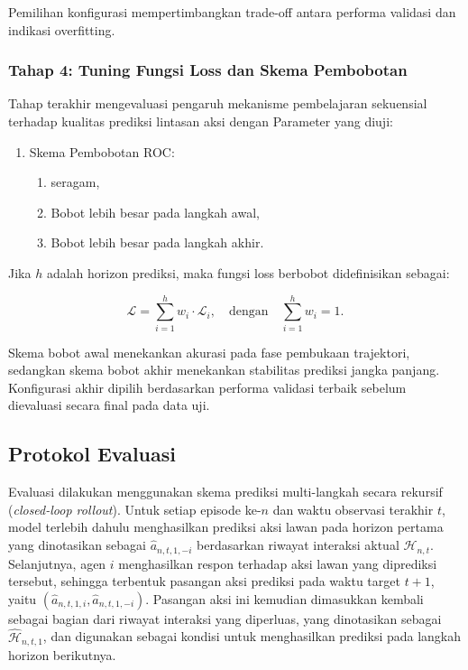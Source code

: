 \noindent
Pemilihan konfigurasi mempertimbangkan trade-off antara performa validasi dan indikasi overfitting.

\subsubsection{Tahap 4: Tuning Fungsi Loss dan Skema Pembobotan}

Tahap terakhir mengevaluasi pengaruh mekanisme pembelajaran sekuensial terhadap kualitas prediksi lintasan aksi dengan Parameter yang diuji:

\begin{enumerate}
    \item Skema Pembobotan ROC:
    \begin{enumerate}
        \item seragam,
        \item Bobot lebih besar pada langkah awal,
        \item Bobot lebih besar pada langkah akhir.
    \end{enumerate}
\end{enumerate}

\noindent
Jika $h$ adalah horizon prediksi, maka fungsi loss berbobot didefinisikan sebagai:

\begin{equation}
\mathcal{L} =
\sum_{i=1}^{h}
w_i \cdot \mathcal{L}_i,
\quad
\text{dengan}
\quad
\sum_{i=1}^{h} w_i = 1.
\end{equation}

\noindent
Skema bobot awal menekankan akurasi pada fase pembukaan trajektori, sedangkan skema bobot akhir menekankan stabilitas prediksi jangka panjang. Konfigurasi akhir dipilih berdasarkan performa validasi terbaik sebelum dievaluasi secara final pada data uji.


\subsection{Protokol Evaluasi}

Evaluasi dilakukan menggunakan skema prediksi multi-langkah secara rekursif (\textit{closed-loop rollout}). Untuk setiap episode ke-$n$ dan waktu observasi terakhir $t$, model terlebih dahulu menghasilkan prediksi aksi lawan pada horizon pertama yang dinotasikan sebagai $\hat{a}_{n,t,1,-i}$ berdasarkan riwayat interaksi aktual $\mathcal{H}_{n,t}$. Selanjutnya, agen $i$ menghasilkan respon terhadap aksi lawan yang diprediksi tersebut, sehingga terbentuk pasangan aksi prediksi pada waktu target $t+1$, yaitu $(\hat{a}_{n,t,1,i}, \hat{a}_{n,t,1,-i})$. Pasangan aksi ini kemudian dimasukkan kembali sebagai bagian dari riwayat interaksi yang diperluas, yang dinotasikan sebagai $\hat{\mathcal{H}}_{n,t,1}$, dan digunakan sebagai kondisi untuk menghasilkan prediksi pada langkah horizon berikutnya.

